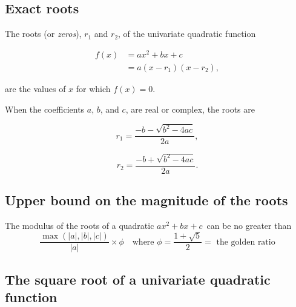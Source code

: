\subsection{Exact roots}
\label{sss:exac-bff6}




The roots (or \textit{zeros}), $r _1$ and $r _2$, of the univariate quadratic function



\begin{align} f(x) & = ax^2 + bx + c \\ & = a(x - r _1)(x - r _2), \end{align}



are the values of $x$ for which $f(x) = 0$.



When the coefficients $a$, $b$, and $c$, are real or complex, the roots are



$$r _1=\frac{-b - \sqrt{b^2-4ac}}{2a},$$



$$r _2=\frac{-b + \sqrt{b^2-4ac}}{2a}.$$




\subsection{Upper bound on the magnitude of the roots}
\label{sss:uppe-d41d}




The modulus of the roots of a quadratic $ax^2+bx+c\,$ can be no greater than
$$\frac{\max(|a|, |b|, |c|)}{|a|}\times \phi \quad \text{where } \phi=\frac{1+\sqrt{5}}{2}
= \text{ the golden ratio}$$




\subsection{The square root of a univariate quadratic function}
\label{sss:thes-bc34}




